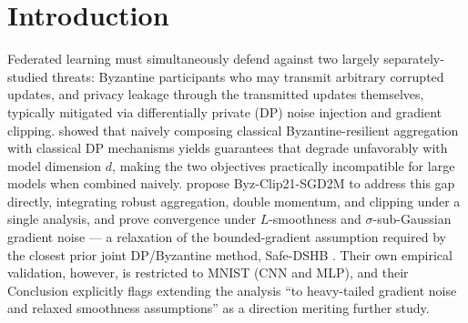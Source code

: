 \documentclass{article}
\begin{document}
\begin{abstract}
to the full DP+Byzantine protocol for any of the three algorithms, so
single-condition tuning is not a valid stand-in for the source paper's own
per-$\varepsilon$, DP-aware grid in this joint regime -- a caution about
tuning transferability under joint DP-Byzantine noise, not a gap in our
replication. On CIFAR-10, all three algorithms are statistically indistinguishable
and collapse to chance together, a more direct finding independent of any
tuning caveat: the CIFAR-10 gap is not specific to Byz-Clip21-SGD2M. We
report every known gap in our replication honestly, including a corrected
theoretical positioning relative to \citeauthor{allouah2023trilemma}'s tight
dimension-dependent lower bound and two corrections to our own earlier
internal pilot analysis.
\end{abstract}

\section{Introduction}
Federated learning must simultaneously defend against two largely
separately-studied threats: Byzantine participants who may transmit arbitrary
corrupted updates, and privacy leakage through the transmitted updates themselves,
typically mitigated via differentially private (DP) noise injection and gradient
clipping. \citet{guerraoui2021differential} showed that naively composing classical
Byzantine-resilient aggregation with classical DP mechanisms yields guarantees that
degrade unfavorably with model dimension $d$, making the two objectives
practically incompatible for large models when combined naively.
\citet{islamov2026byzclip} propose Byz-Clip21-SGD2M to address this gap directly,
integrating robust aggregation, double momentum, and clipping under a single
analysis, and prove convergence under $L$-smoothness and $\sigma$-sub-Gaussian
gradient noise --- a relaxation of the bounded-gradient assumption required by
the closest prior joint DP/Byzantine method, Safe-DSHB
\citep{allouah2023trilemma}. Their own empirical validation, however, is
restricted to MNIST (CNN and MLP), and their Conclusion explicitly flags
extending the analysis ``to heavy-tailed gradient noise and relaxed smoothness
assumptions'' as a direction meriting further study.
\end{document}
